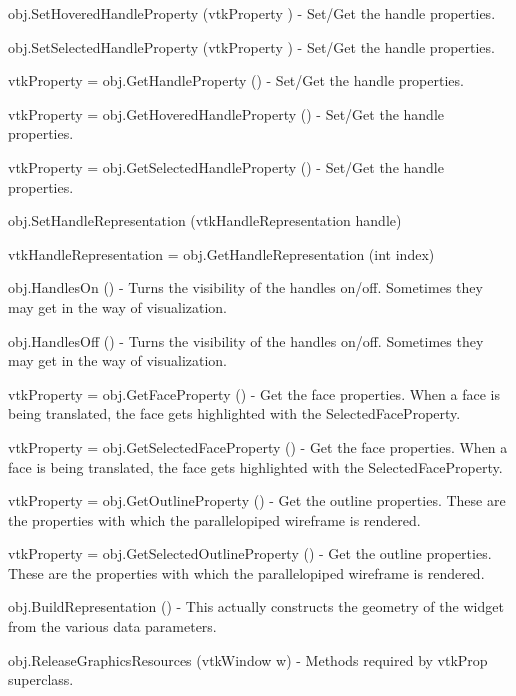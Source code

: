 \begin{DoxyItemize}
\item {\ttfamily obj.\-Set\-Hovered\-Handle\-Property (vtk\-Property )} -\/ Set/\-Get the handle properties.  
\item {\ttfamily obj.\-Set\-Selected\-Handle\-Property (vtk\-Property )} -\/ Set/\-Get the handle properties.  
\item {\ttfamily vtk\-Property = obj.\-Get\-Handle\-Property ()} -\/ Set/\-Get the handle properties.  
\item {\ttfamily vtk\-Property = obj.\-Get\-Hovered\-Handle\-Property ()} -\/ Set/\-Get the handle properties.  
\item {\ttfamily vtk\-Property = obj.\-Get\-Selected\-Handle\-Property ()} -\/ Set/\-Get the handle properties.  
\item {\ttfamily obj.\-Set\-Handle\-Representation (vtk\-Handle\-Representation handle)}  
\item {\ttfamily vtk\-Handle\-Representation = obj.\-Get\-Handle\-Representation (int index)}  
\item {\ttfamily obj.\-Handles\-On ()} -\/ Turns the visibility of the handles on/off. Sometimes they may get in the way of visualization.  
\item {\ttfamily obj.\-Handles\-Off ()} -\/ Turns the visibility of the handles on/off. Sometimes they may get in the way of visualization.  
\item {\ttfamily vtk\-Property = obj.\-Get\-Face\-Property ()} -\/ Get the face properties. When a face is being translated, the face gets highlighted with the Selected\-Face\-Property.  
\item {\ttfamily vtk\-Property = obj.\-Get\-Selected\-Face\-Property ()} -\/ Get the face properties. When a face is being translated, the face gets highlighted with the Selected\-Face\-Property.  
\item {\ttfamily vtk\-Property = obj.\-Get\-Outline\-Property ()} -\/ Get the outline properties. These are the properties with which the parallelopiped wireframe is rendered.  
\item {\ttfamily vtk\-Property = obj.\-Get\-Selected\-Outline\-Property ()} -\/ Get the outline properties. These are the properties with which the parallelopiped wireframe is rendered.  
\item {\ttfamily obj.\-Build\-Representation ()} -\/ This actually constructs the geometry of the widget from the various data parameters.  
\item {\ttfamily obj.\-Release\-Graphics\-Resources (vtk\-Window w)} -\/ Methods required by vtk\-Prop superclass.  

\end{DoxyItemize}
